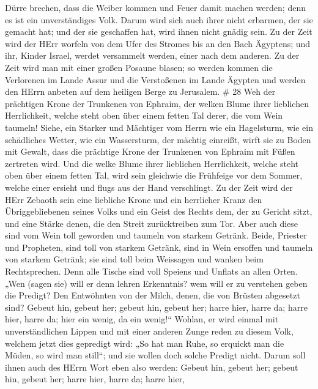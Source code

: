 Dürre brechen, dass die Weiber kommen und Feuer damit machen werden;
denn es ist ein unverständiges Volk. Darum wird sich auch ihrer nicht
erbarmen, der sie gemacht hat; und der sie geschaffen hat, wird ihnen
nicht gnädig sein.  Zu der Zeit wird der HErr worfeln von
dem Ufer des Stromes bis an den Bach Ägyptens; und ihr, Kinder Israel,
werdet versammelt werden, einer nach dem anderen.  Zu der
Zeit wird man mit einer großen Posaune blasen; so werden kommen die
Verlorenen im Lande Assur und die Verstoßenen im Lande Ägypten und
werden den HErrn anbeten auf dem heiligen Berge zu Jerusalem. \# 28
 Weh der prächtigen Krone der Trunkenen von Ephraim, der
welken Blume ihrer lieblichen Herrlichkeit, welche steht oben über einem
fetten Tal derer, die vom Wein taumeln!  Siehe, ein Starker
und Mächtiger vom Herrn wie ein Hagelsturm, wie ein schädliches Wetter,
wie ein Wassersturm, der mächtig einreißt, wirft sie zu Boden mit
Gewalt,  dass die prächtige Krone der Trunkenen von Ephraim
mit Füßen zertreten wird.  Und die welke Blume ihrer
lieblichen Herrlichkeit, welche steht oben über einem fetten Tal, wird
sein gleichwie die Frühfeige vor dem Sommer, welche einer ersieht und
flugs aus der Hand verschlingt.  Zu der Zeit wird der HErr
Zebaoth sein eine liebliche Krone und ein herrlicher Kranz den
Übriggebliebenen seines Volks  und ein Geist des Rechts dem,
der zu Gericht sitzt, und eine Stärke denen, die den Streit
zurücktreiben zum Tor.  Aber auch diese sind vom Wein toll
geworden und taumeln von starkem Getränk. Beide, Priester und Propheten,
sind toll von starkem Getränk, sind in Wein ersoffen und taumeln von
starkem Getränk; sie sind toll beim Weissagen und wanken beim
Rechtsprechen.  Denn alle Tische sind voll Speiens und
Unflats an allen Orten.  „Wen (sagen sie) will er denn
lehren Erkenntnis? wem will er zu verstehen geben die Predigt? Den
Entwöhnten von der Milch, denen, die von Brüsten abgesetzt sind?
 Gebeut hin, gebeut her; gebeut hin, gebeut her; harre
hier, harre da; harre hier, harre da; hier ein wenig, da ein wenig!{}``
 Wohlan, er wird einmal mit unverständlichen Lippen und mit
einer anderen Zunge reden zu diesem Volk, welchem jetzt dies gepredigt
wird:  „So hat man Ruhe, so erquickt man die Müden, so wird
man still``; und sie wollen doch solche Predigt nicht. 
Darum soll ihnen auch des HErrn Wort eben also werden: Gebeut hin,
gebeut her; gebeut hin, gebeut her; harre hier, harre da; harre hier,
